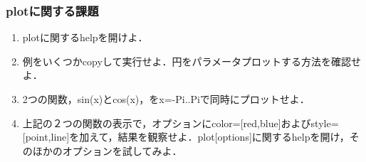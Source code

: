 \subsubsection{plotに関する課題}
\begin{enumerate}
\item plotに関するhelpを開けよ．
\item 例をいくつかcopyして実行せよ．円をパラメータプロットする方法を確認せよ．
\item 2つの関数，sin(x)とcos(x)，をx=-Pi..Piで同時にプロットせよ．
\item 上記の２つの関数の表示で，オプションにcolor=[red,blue]およびstyle=[point,line]を加えて，結果を観察せよ．plot[options]に関するhelpを開け，そのほかのオプションを試してみよ．
\end{enumerate}
